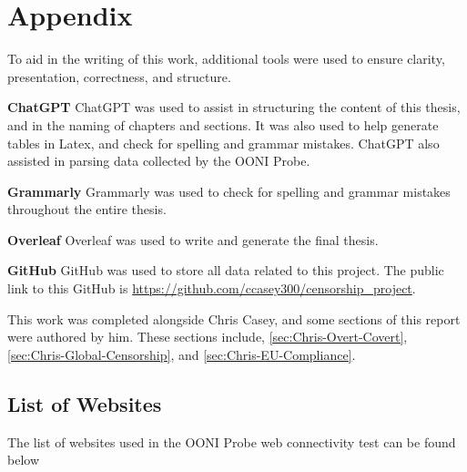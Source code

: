 \chapter{Appendix}

To aid in the writing of this work, additional tools were used to ensure clarity, presentation, correctness, and structure.

\textbf{ChatGPT} ChatGPT was used to assist in structuring the content of this thesis, and in the naming of chapters and sections. It was also used to help generate tables in Latex, and check for spelling and grammar mistakes. ChatGPT also assisted in parsing data collected by the OONI Probe.

\textbf{Grammarly} Grammarly was used to check for spelling and grammar mistakes throughout the entire thesis.

\textbf{Overleaf} Overleaf was used to write and generate the final thesis.

\textbf{GitHub} GitHub was used to store all data related to this project. The public link to this GitHub is \url{https://github.com/ccasey300/censorship_project}.

This work was completed alongside Chris Casey, and some sections of this report were authored by him. These sections include, \ref{sec:Chris-Overt-Covert}, \ref{sec:Chris-Global-Censorship}, and \ref{sec:Chris-EU-Compliance}.

\section{List of Websites}

The list of websites used in the OONI Probe web connectivity test can be found below


